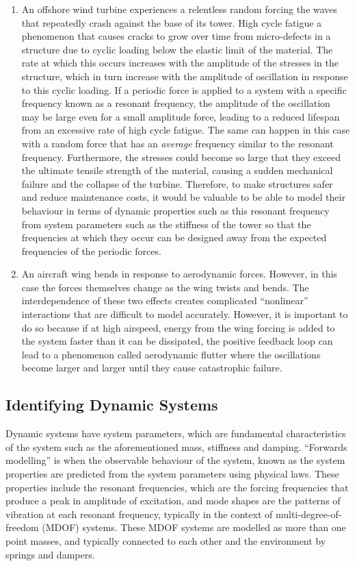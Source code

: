 \documentclass[12pt]{article}
\begin{document}
\begin{enumerate}
        \item An offshore wind turbine experiences a relentless random forcing the waves that repeatedly crash against the base of its tower.
        High cycle fatigue a phenomenon that causes cracks to grow over time from micro-defects in a structure due to cyclic loading below the elastic limit of the material.
        The rate at which this occurs increases with the amplitude of the stresses in the structure, which in turn increase with the amplitude of oscillation in response to this cyclic loading.
        If a periodic force is applied to a system with a specific frequency known as a resonant frequency, the amplitude of the oscillation may be large even for a small amplitude force, leading to a reduced lifespan from an excessive rate of high cycle fatigue.
        The same can happen in this case with a random force that has an \textit{average} frequency similar to the resonant frequency.
        Furthermore, the stresses could become so large that they exceed the ultimate tensile strength of the material, causing a sudden mechanical failure and the collapse of the turbine.
        Therefore, to make structures safer and reduce maintenance costs, it would be valuable to be able to model their behaviour in terms of dynamic properties such as this resonant frequency from system parameters such as the stiffness of the tower so that the frequencies at which they occur can be designed away from the expected frequencies of the periodic forces.

        \item An aircraft wing bends in response to aerodynamic forces.
        However, in this case the forces themselves change as the wing twists and bends.
        The interdependence of these two effects creates complicated ``nonlinear'' interactions that are difficult to model accurately.
        However, it is important to do so because if at high airspeed, energy from the wing forcing is added to the system faster than it can be dissipated, the positive feedback loop can lead to a phenomenon called aerodynamic flutter where the oscillations become larger and larger until they cause catastrophic failure.
    \end{enumerate}

    \subsection{Identifying Dynamic Systems}

    Dynamic systems have system parameters, which are fundamental characteristics of the system such as the aforementioned mass, stiffness and damping.
    ``Forwards modelling'' is when the observable behaviour of the system, known as the system properties are predicted from the system parameters using physical laws.
    These properties include the resonant frequencies, which are the forcing frequencies that produce a peak in amplitude of excitation, and mode shapes are the patterns of vibration at each resonant frequency, typically in the context of multi-degree-of-freedom (MDOF) systems.
    These MDOF systems are modelled as more than one point masses, and typically connected to each other and the environment by springs and dampers.
\end{document}
